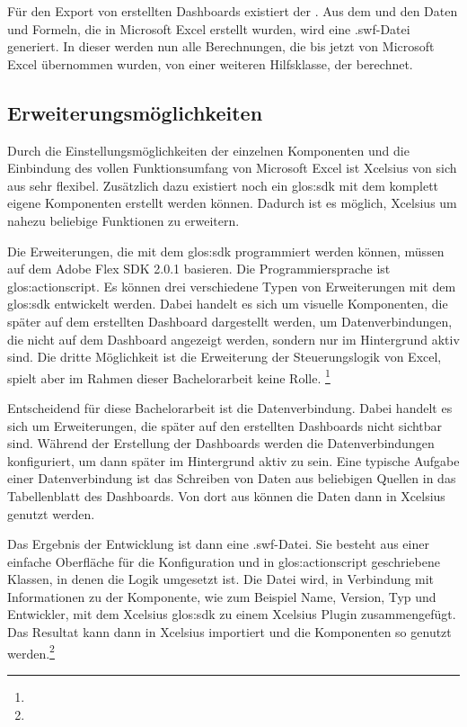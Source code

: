 \begin{onehalfspacing}
Für den Export von erstellten Dashboards existiert der . Aus dem  und den Daten und Formeln, die in Microsoft Excel erstellt wurden, wird eine .swf-Datei generiert. In dieser werden nun alle Berechnungen, die bis jetzt von Microsoft Excel übernommen wurden, von einer weiteren Hilfsklasse, der  berechnet.

\subsection{Erweiterungsmöglichkeiten}

Durch die Einstellungsmöglichkeiten der einzelnen Komponenten und die Einbindung des vollen Funktionsumfang von Microsoft Excel ist \gls{Xcelsius} von sich aus sehr flexibel. Zusätzlich dazu existiert noch ein \gls{glos:sdk} mit dem komplett eigene Komponenten erstellt werden können. Dadurch ist es möglich, \gls{Xcelsius} um nahezu beliebige Funktionen zu erweitern.

Die Erweiterungen, die mit dem \gls{glos:sdk} programmiert werden können, müssen auf dem Adobe Flex SDK 2.0.1 basieren. Die Programmiersprache ist \gls{glos:actionscript}. Es können drei verschiedene Typen von Erweiterungen mit dem \gls{glos:sdk} entwickelt werden. Dabei handelt es sich um visuelle Komponenten, die später auf dem erstellten Dashboard dargestellt werden, um Datenverbindungen, die nicht auf dem Dashboard angezeigt werden, sondern nur im Hintergrund aktiv sind. Die dritte Möglichkeit ist die Erweiterung der Steuerungslogik von Excel, spielt aber im Rahmen dieser Bachelorarbeit keine Rolle. \footnote{ }

Entscheidend für diese Bachelorarbeit ist die Datenverbindung. Dabei handelt es sich um Erweiterungen, die später auf den erstellten Dashboards nicht sichtbar sind. Während der Erstellung der Dashboards werden die Datenverbindungen konfiguriert, um dann später im Hintergrund aktiv zu sein. Eine typische Aufgabe einer Datenverbindung ist das Schreiben von Daten aus beliebigen Quellen in das Tabellenblatt des Dashboards. Von dort aus können die Daten dann in Xcelsius genutzt werden.

Das Ergebnis der Entwicklung ist dann eine .swf-Datei. Sie besteht aus einer einfache Oberfläche für die Konfiguration und in \gls{glos:actionscript} geschriebene Klassen, in denen die Logik umgesetzt ist. Die Datei wird, in Verbindung mit Informationen zu der Komponente, wie zum Beispiel Name, Version, Typ und Entwickler, mit dem \gls{Xcelsius} \gls{glos:sdk} zu einem \gls{Xcelsius} Plugin zusammengefügt. Das Resultat kann dann in \gls{Xcelsius} importiert und die Komponenten so genutzt werden.\footnote{ }


\end{onehalfspacing}
